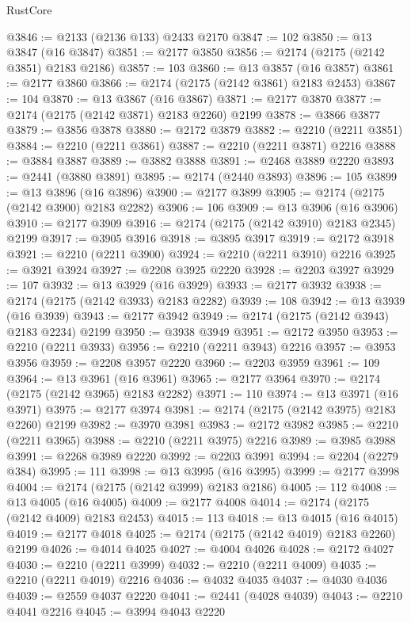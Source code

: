 \begin{lexlean}{RustCore}
\begin{coremodule}
@3846 := @2133 (@2136 @133) @2433 @2170
@3847 := 102
@3850 := @13 @3847 (@16 @3847)
@3851 := @2177 @3850
@3856 := @2174 (@2175 (@2142 @3851) @2183 @2186)
@3857 := 103
@3860 := @13 @3857 (@16 @3857)
@3861 := @2177 @3860
@3866 := @2174 (@2175 (@2142 @3861) @2183 @2453)
@3867 := 104
@3870 := @13 @3867 (@16 @3867)
@3871 := @2177 @3870
@3877 := @2174 (@2175 (@2142 @3871) @2183 @2260) @2199
@3878 := @3866 @3877
@3879 := @3856 @3878
@3880 := @2172 @3879
@3882 := @2210 (@2211 @3851)
@3884 := @2210 (@2211 @3861)
@3887 := @2210 (@2211 @3871) @2216
@3888 := @3884 @3887
@3889 := @3882 @3888
@3891 := @2468 @3889 @2220
@3893 := @2441 (@3880 @3891)
@3895 := @2174 (@2440 @3893)
@3896 := 105
@3899 := @13 @3896 (@16 @3896)
@3900 := @2177 @3899
@3905 := @2174 (@2175 (@2142 @3900) @2183 @2282)
@3906 := 106
@3909 := @13 @3906 (@16 @3906)
@3910 := @2177 @3909
@3916 := @2174 (@2175 (@2142 @3910) @2183 @2345) @2199
@3917 := @3905 @3916
@3918 := @3895 @3917
@3919 := @2172 @3918
@3921 := @2210 (@2211 @3900)
@3924 := @2210 (@2211 @3910) @2216
@3925 := @3921 @3924
@3927 := @2208 @3925 @2220
@3928 := @2203 @3927
@3929 := 107
@3932 := @13 @3929 (@16 @3929)
@3933 := @2177 @3932
@3938 := @2174 (@2175 (@2142 @3933) @2183 @2282)
@3939 := 108
@3942 := @13 @3939 (@16 @3939)
@3943 := @2177 @3942
@3949 := @2174 (@2175 (@2142 @3943) @2183 @2234) @2199
@3950 := @3938 @3949
@3951 := @2172 @3950
@3953 := @2210 (@2211 @3933)
@3956 := @2210 (@2211 @3943) @2216
@3957 := @3953 @3956
@3959 := @2208 @3957 @2220
@3960 := @2203 @3959
@3961 := 109
@3964 := @13 @3961 (@16 @3961)
@3965 := @2177 @3964
@3970 := @2174 (@2175 (@2142 @3965) @2183 @2282)
@3971 := 110
@3974 := @13 @3971 (@16 @3971)
@3975 := @2177 @3974
@3981 := @2174 (@2175 (@2142 @3975) @2183 @2260) @2199
@3982 := @3970 @3981
@3983 := @2172 @3982
@3985 := @2210 (@2211 @3965)
@3988 := @2210 (@2211 @3975) @2216
@3989 := @3985 @3988
@3991 := @2268 @3989 @2220
@3992 := @2203 @3991
@3994 := @2204 (@2279 @384)
@3995 := 111
@3998 := @13 @3995 (@16 @3995)
@3999 := @2177 @3998
@4004 := @2174 (@2175 (@2142 @3999) @2183 @2186)
@4005 := 112
@4008 := @13 @4005 (@16 @4005)
@4009 := @2177 @4008
@4014 := @2174 (@2175 (@2142 @4009) @2183 @2453)
@4015 := 113
@4018 := @13 @4015 (@16 @4015)
@4019 := @2177 @4018
@4025 := @2174 (@2175 (@2142 @4019) @2183 @2260) @2199
@4026 := @4014 @4025
@4027 := @4004 @4026
@4028 := @2172 @4027
@4030 := @2210 (@2211 @3999)
@4032 := @2210 (@2211 @4009)
@4035 := @2210 (@2211 @4019) @2216
@4036 := @4032 @4035
@4037 := @4030 @4036
@4039 := @2559 @4037 @2220
@4041 := @2441 (@4028 @4039)
@4043 := @2210 @4041 @2216
@4045 := @3994 @4043 @2220

\end{coremodule}
\end{lexlean}
